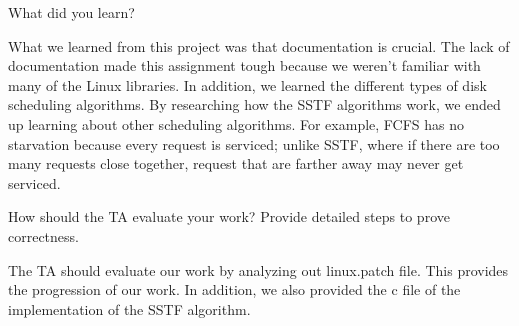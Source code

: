 \documentclass{article}
\newenvironment{question}[2][Question]{\begin{trivlist}
\item[\hskip \labelsep {\bfseries #1}\hskip \labelsep {\bfseries #2.}]}{\end{trivlist}}
\begin{document}

\vspace{0.25in}
\begin{question}{4}
What did you learn?
\end{question}
What we learned from this project was that documentation is crucial. The lack of documentation made this assignment tough because we weren’t familiar with many of the Linux libraries. In addition, we learned the different types of disk scheduling algorithms. By researching how the SSTF algorithms work, we ended up learning about other scheduling algorithms. For example, FCFS has no starvation because every request is serviced; unlike SSTF, where if there are too many requests close together, request that are farther away may never get serviced. 



\vspace{0.25in}
\begin{question}{5}
How should the TA evaluate your work? Provide detailed steps to prove correctness.
\end{question}
The TA should evaluate our work by analyzing out linux.patch file. This provides the progression of our work. In addition, we also provided the c file of the implementation of the SSTF algorithm. 


\end{document}
